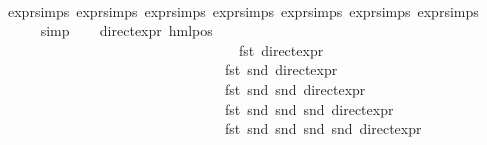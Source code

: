 \begin{isabellebody}
\ \ \ \ \isamarkupfalse%
\ expr{\isachardot}{\kern0pt}simps\ expr{\isacharunderscore}{\kern0pt}{}{\isachardot}{\kern0pt}simps\ expr{\isacharunderscore}{\kern0pt}{}{\isachardot}{\kern0pt}simps\ expr{\isacharunderscore}{\kern0pt}{}{\isachardot}{\kern0pt}simps\ expr{\isacharunderscore}{\kern0pt}{}{\isachardot}{\kern0pt}simps\ expr{\isacharunderscore}{\kern0pt}{}{\isachardot}{\kern0pt}simps\ expr{\isacharunderscore}{\kern0pt}{}{\isachardot}{\kern0pt}simps\isanewline
\ \ \ \ \isamarkupfalse%
\ simp\isanewline
\ \ \isamarkupfalse%
\ {\isachardoublequoteopen}direct{\isacharunderscore}{\kern0pt}expr\ {\isacharparenleft}{\kern0pt}hml{\isacharunderscore}{\kern0pt}pos\ {\isasymalpha}\ {\isasymphi}{\isacharparenright}{\kern0pt}\ {\isacharequal}{\kern0pt}\ \isanewline
\ \ \ \ \ \ \ \ \ \ \ \ \ \ \ \ \ \ \ \ \ \ \ \ \ \ \ \ \ \ \ \ {\isacharparenleft}{\kern0pt}{}\ {\isacharplus}{\kern0pt}\ fst\ {\isacharparenleft}{\kern0pt}direct{\isacharunderscore}{\kern0pt}expr\ {\isasymphi}{\isacharparenright}{\kern0pt}{\isacharcomma}{\kern0pt}\ \isanewline
\ \ \ \ \ \ \ \ \ \ \ \ \ \ \ \ \ \ \ \ \ \ \ \ \ \ \ \ \ \ \ \ fst\ {\isacharparenleft}{\kern0pt}snd\ {\isacharparenleft}{\kern0pt}direct{\isacharunderscore}{\kern0pt}expr\ {\isasymphi}{\isacharparenright}{\kern0pt}{\isacharparenright}{\kern0pt}{\isacharcomma}{\kern0pt}\ \isanewline
\ \ \ \ \ \ \ \ \ \ \ \ \ \ \ \ \ \ \ \ \ \ \ \ \ \ \ \ \ \ \ \ fst\ {\isacharparenleft}{\kern0pt}snd\ {\isacharparenleft}{\kern0pt}snd\ {\isacharparenleft}{\kern0pt}direct{\isacharunderscore}{\kern0pt}expr\ {\isasymphi}{\isacharparenright}{\kern0pt}{\isacharparenright}{\kern0pt}{\isacharparenright}{\kern0pt}{\isacharcomma}{\kern0pt}\ \isanewline
\ \ \ \ \ \ \ \ \ \ \ \ \ \ \ \ \ \ \ \ \ \ \ \ \ \ \ \ \ \ \ \ fst\ {\isacharparenleft}{\kern0pt}snd\ {\isacharparenleft}{\kern0pt}snd\ {\isacharparenleft}{\kern0pt}snd\ {\isacharparenleft}{\kern0pt}direct{\isacharunderscore}{\kern0pt}expr\ {\isasymphi}{\isacharparenright}{\kern0pt}{\isacharparenright}{\kern0pt}{\isacharparenright}{\kern0pt}{\isacharparenright}{\kern0pt}{\isacharcomma}{\kern0pt}\ \isanewline
\ \ \ \ \ \ \ \ \ \ \ \ \ \ \ \ \ \ \ \ \ \ \ \ \ \ \ \ \ \ \ \ fst\ {\isacharparenleft}{\kern0pt}snd\ {\isacharparenleft}{\kern0pt}snd\ {\isacharparenleft}{\kern0pt}snd\ {\isacharparenleft}{\kern0pt}snd\ {\isacharparenleft}{\kern0pt}direct{\isacharunderscore}{\kern0pt}expr\ {\isasymphi}{\isacharparenright}{\kern0pt}{\isacharparenright}{\kern0pt}{\isacharparenright}{\kern0pt}{\isacharparenright}{\kern0pt}{\isacharparenright}{\kern0pt}{\isacharcomma}{\kern0pt}\ \isanewline

\end{isabellebody}
